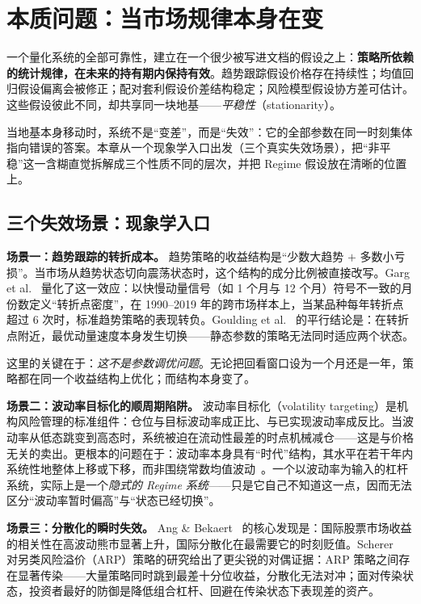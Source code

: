
\section{本质问题：当市场规律本身在变}
\label{sec:essence}

一个量化系统的全部可靠性，建立在一个很少被写进文档的假设之上：\textbf{策略所依赖的统计规律，在未来的持有期内保持有效}。趋势跟踪假设价格存在持续性；均值回归假设偏离会被修正；配对套利假设价差结构稳定；风险模型假设协方差可估计。这些假设彼此不同，却共享同一块地基——\emph{平稳性}（stationarity）。

当地基本身移动时，系统不是“变差”，而是“失效”：它的全部参数在同一时刻集体指向错误的答案。本章从一个现象学入口出发（三个真实失效场景），把“非平稳”这一含糊直觉拆解成三个性质不同的层次，并把 Regime 假设放在清晰的位置上。

\subsection{三个失效场景：现象学入口}

\textbf{场景一：趋势跟踪的转折成本。}
趋势策略的收益结构是“少数大趋势 $+$ 多数小亏损”。当市场从趋势状态切向震荡状态时，这个结构的成分比例被直接改写。Garg et al.~\cite{garg2024} 量化了这一效应：以快慢动量信号（如 1 个月与 12 个月）符号不一致的月份数定义“转折点密度”，在 1990--2019 年的跨市场样本上，当某品种每年转折点超过 6 次时，标准趋势策略的表现转负。Goulding et al.~\cite{goulding2023} 的平行结论是：在转折点附近，最优动量速度本身发生切换——静态参数的策略无法同时适应两个状态。

这里的关键在于：\emph{这不是参数调优问题}。无论把回看窗口设为一个月还是一年，策略都在同一个收益结构上优化；而结构本身变了。

\textbf{场景二：波动率目标化的顺周期陷阱。}
波动率目标化（volatility targeting）是机构风险管理的标准组件：仓位与目标波动率成正比、与已实现波动率成反比。当波动率从低态跳变到高态时，系统被迫在流动性最差的时点机械减仓——这是与价格无关的卖出。更根本的问题在于：波动率本身具有“时代”结构，其水平在若干年内系统性地整体上移或下移，而非围绕常数均值波动~\cite{ang2012,nystrup2015}。一个以波动率为输入的杠杆系统，实际上是一个\emph{隐式的 Regime 系统}——只是它自己不知道这一点，因而无法区分“波动率暂时偏高”与“状态已经切换”。

\textbf{场景三：分散化的瞬时失效。}
Ang \& Bekaert~\cite{ang2002} 的核心发现是：国际股票市场收益的相关性在高波动熊市显著上升，国际分散化在最需要它的时刻贬值。Scherer~\cite{scherer2020} 对另类风险溢价（ARP）策略的研究给出了更尖锐的对偶证据：ARP 策略之间存在显著传染——大量策略同时跳到最差十分位收益，分散化无法对冲；面对传染状态，投资者最好的防御是降低组合杠杆、回避在传染状态下表现差的资产。

